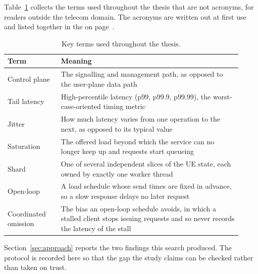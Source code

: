\documentclass[english,oneside,a4paper,censored,csm,software-track-2020]{HYthesisML}
\renewcommand{\arraystretch}{0.95}
\begin{document}
\backmatter
\begin{appendices}

Table~\ref{tab:abbrev} collects the terms used throughout the thesis that are not acronyms, for
readers outside the telecom domain. The acronyms are written out at first use and listed together
in the \nomname{} on page~\pageref{page:acronyms}.

\begin{table}[H]
\centering
\caption[Key terms]{Key terms used throughout the thesis.\label{tab:abbrev}}
\singlespacing
\footnotesize
\renewcommand{\arraystretch}{1.2}
\begin{tabular}{@{}p{0.21\linewidth} p{0.71\linewidth}@{}}
\hline\hline
Term & Meaning \\
\hline
Control plane & The signalling and management path, as opposed to the user-plane data path \\
Tail latency & High-percentile latency (p99, p99.9, p99.99), the worst-case-oriented timing metric \\
Jitter & How much latency varies from one operation to the next, as opposed to its typical value \\
Saturation & The offered load beyond which the service can no longer keep up and requests start queueing \\
Shard & One of several independent slices of the UE state, each owned by exactly one worker thread \\
Open-loop & A load schedule whose send times are fixed in advance, so a slow response delays no later request \\
Coordinated omission & The bias an open-loop schedule avoids, in which a stalled client stops issuing requests and so never records the latency of the stall \\
\hline
\end{tabular}
\end{table}

Section~\ref{sec:approach} reports the two findings this search produced. The protocol is recorded
here so that the gap the study claims can be checked rather than taken on trust.


\end{appendices}
\end{document}
